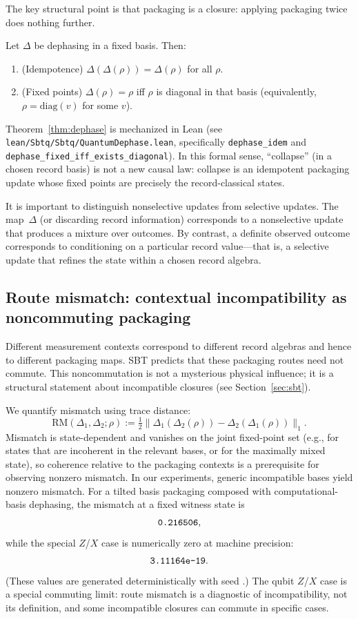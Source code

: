 The key structural point is that packaging is a closure: applying packaging twice does nothing further.

\begin{theorem}\label{thm:dephase}
Let $\Delta$ be dephasing in a fixed basis.
Then:
\begin{enumerate}
  \item (Idempotence) $\Delta(\Delta(\rho))=\Delta(\rho)$ for all $\rho$.
  \item (Fixed points) $\Delta(\rho)=\rho$ iff $\rho$ is diagonal in that basis (equivalently, $\rho=\mathrm{diag}(v)$ for some $v$).
\end{enumerate}
\end{theorem}

Theorem~\ref{thm:dephase} is mechanized in Lean (see \texttt{lean/Sbtq/Sbtq/QuantumDephase.lean}, specifically \texttt{dephase\_idem} and \texttt{dephase\_fixed\_iff\_exists\_diagonal}).
In this formal sense, ``collapse'' (in a chosen record basis) is not a new causal law: collapse is an idempotent packaging update whose fixed points are precisely the record-classical states.

It is important to distinguish nonselective updates from selective updates. The map~$\Delta$ (or discarding record information) corresponds to a nonselective update that produces a mixture over outcomes. By contrast, a definite observed outcome corresponds to conditioning on a particular record value---that is, a selective update that refines the state within a chosen record algebra.

\subsection{Route mismatch: contextual incompatibility as noncommuting packaging}

Different measurement contexts correspond to different record algebras and hence to different packaging maps.
SBT predicts that these packaging routes need not commute.
This noncommutation is not a mysterious physical influence; it is a structural statement about incompatible closures (see Section~\ref{sec:sbt}).

We quantify mismatch using trace distance:
\[
\mathrm{RM}(\Delta_1,\Delta_2;\rho) := \tfrac12\|\Delta_1(\Delta_2(\rho))-\Delta_2(\Delta_1(\rho))\|_1.
\]
Mismatch is state-dependent and vanishes on the joint fixed-point set (e.g., for states that are incoherent in the relevant bases, or for the maximally mixed state), so coherence relative to the packaging contexts is a prerequisite for observing nonzero mismatch.
In our experiments, generic incompatible bases yield nonzero mismatch.
For a tilted basis packaging composed with computational-basis dephasing, the mismatch at a fixed witness state is
\[
\texttt{0.216506},
\]
while the special $Z$/$X$ case is numerically zero at machine precision:
\[
\texttt{3.11164e-19}.
\]
(These values are generated deterministically with seed \texttt{\RepoSeed}.) The qubit $Z$/$X$ case is a special commuting limit: route mismatch is a diagnostic of incompatibility, not its definition, and some incompatible closures can commute in specific cases.

